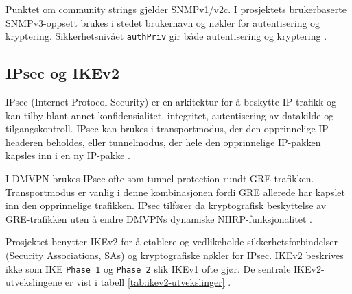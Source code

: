 Punktet om community strings gjelder SNMPv1/v2c. I prosjektets brukerbaserte SNMPv3-oppsett brukes i stedet brukernavn og nøkler for autentisering og kryptering. Sikkerhetsnivået \texttt{authPriv} gir både autentisering og kryptering \cite{cisco_snmp_security}.

\subsection{IPsec og IKEv2}

IPsec (Internet Protocol Security) er en arkitektur for å beskytte IP-trafikk og kan tilby blant annet konfidensialitet, integritet, autentisering av datakilde og tilgangskontroll. IPsec kan brukes i transportmodus, der den opprinnelige IP-headeren beholdes, eller tunnelmodus, der hele den opprinnelige IP-pakken kapsles inn i en ny IP-pakke \cite{rfc4301}.

I DMVPN brukes IPsec ofte som tunnel protection rundt GRE-trafikken. Transportmodus er vanlig i denne kombinasjonen fordi GRE allerede har kapslet inn den opprinnelige trafikken. IPsec tilfører da kryptografisk beskyttelse av GRE-trafikken uten å endre DMVPNs dynamiske NHRP-funksjonalitet \cite{cisco_dmvpn_ipsec_transport}.

Prosjektet benytter IKEv2 for å etablere og vedlikeholde sikkerhetsforbindelser (Security Associations, SAs) og kryptografiske nøkler for IPsec. IKEv2 beskrives ikke som IKE \texttt{Phase 1} og \texttt{Phase 2} slik IKEv1 ofte gjør. De sentrale IKEv2-utvekslingene er vist i tabell \ref{tab:ikev2-utvekslinger} \cite{rfc7296}.

